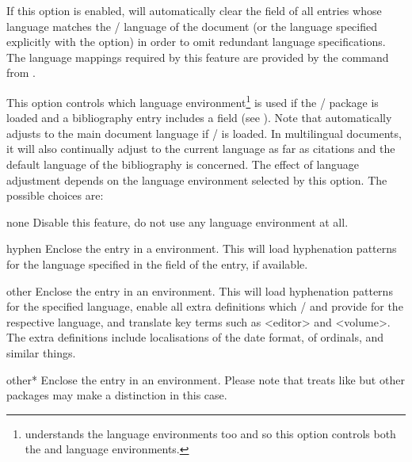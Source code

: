 \documentclass{ltxdockit}[2011/03/25]
\newcommand*{\biblatex}{\sty{biblatex}\xspace}
\begin{document}
\begin{optionlist}

If this option is enabled, \biblatex will automatically clear the  field of all entries whose language matches the / language of the document (or the language specified explicitly with the  option) in order to omit redundant language specifications. The language mappings required by this feature are provided by the  command from .


This option controls which  language environment\footnote{ understands the  language environments too and so this option controls both the  and  language environments.} is used if the / package is loaded and a bibliography entry includes a  field (see ). Note that \biblatex automatically adjusts to the main document language if / is loaded. In multilingual documents, it will also continually adjust to the current language as far as citations and the default language of the bibliography is concerned. The effect of language adjustment depends on the language environment selected by this option. The possible choices are:

\begin{valuelist}

\item[none]
Disable this feature, \ie do not use any language environment at all.

\item[hyphen]
Enclose the entry in a  environment. This will load hyphenation patterns for the language specified in the  field of the entry, if available.

\item[other]
Enclose the entry in an  environment. This will load hyphenation patterns for the specified language, enable all extra definitions which / and \biblatex provide for the respective language, and translate key terms such as <editor> and <volume>. The extra definitions include localisations of the date format, of ordinals, and similar things.

\item[other*]
Enclose the entry in an  environment. Please note that \biblatex treats  like  but other packages may make a distinction in this case.


\end{valuelist}
\end{optionlist}
\end{document}
